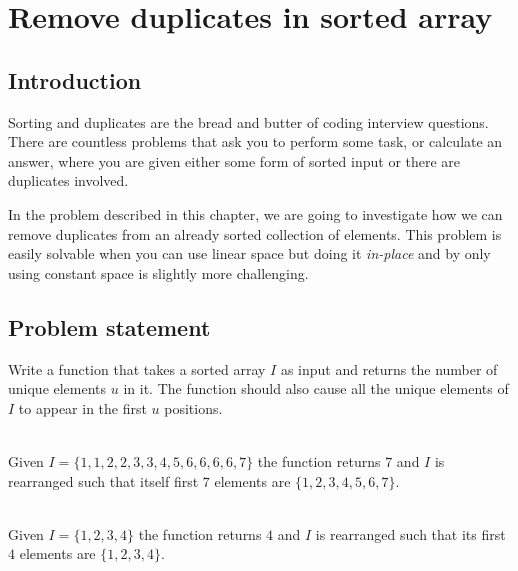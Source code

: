%



\chapter{Remove duplicates in sorted array}
\label{ch:remove_duplicated_sorted_array_inplace}
\section*{Introduction}
Sorting and duplicates are the bread and butter of coding interview questions.
There are countless
problems that ask you to perform some task, or calculate an answer, where you are given either some form of sorted
input or there are duplicates involved.

In the problem described in this chapter, we are going to investigate
how we can remove duplicates from an already sorted collection of elements. This problem is easily solvable when you can use linear space but doing it \textit{in-place} and by only using constant space is slightly more challenging.




\section{Problem statement}
\begin{exercise}
\label{example:remove_duplicated_sorted_array_inplace:exercice1}
Write a function that takes a sorted array $I$ as input and returns the number of unique elements $u$ in it. 
The function should also cause all the unique elements of $I$ to appear in the first $u$ positions.



	\begin{example}
		\label{example:remove_duplicated_sorted_array_inplace:example1}
		\hfill \\
		Given $I=\{1,1,2,2,3,3,4,5,6,6,6,6,7\}$ the function returns $7$ and $I$ is rearranged such
		that itself first $7$ elements are $\{1,2,3,4,5,6,7\}$.				
	\end{example}

	\begin{example}
		\label{example:remove_duplicated_sorted_array_inplace:example2}
		\hfill \\
		Given $I=\{1,2,3,4\}$ the function returns $4$ and $I$ is rearranged such that its first $4$
		elements are $\{1,2,3,4\}$.	
	\end{example}
\end{exercise}

